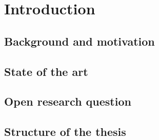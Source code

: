 %
\chapter{Introduction}
\label{ch:introduction}

\section{Background and motivation}
\label{sec:background}

\section{State of the art}
\label{sec:state-of-the-art}
%
%

\section{Open research question}
\label{sec:research-question}
%
%

\section{Structure of the thesis}
\label{sec:structure}
